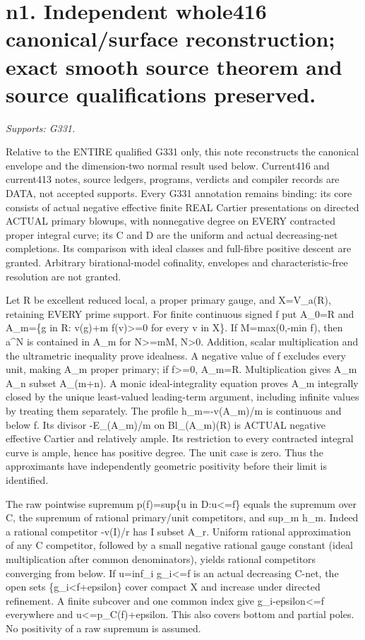 \section{n1. Independent whole416 canonical/surface reconstruction; exact smooth source theorem and source qualifications preserved.}
\textit{Supports: G331.}

Relative to the ENTIRE qualified G331 only, this note reconstructs the canonical envelope and the dimension-two normal result used below. Current416 and current413 notes, source ledgers, programs, verdicts and compiler records are DATA, not accepted supports. Every G331 annotation remains binding: its core consists of actual negative effective finite REAL Cartier presentations on directed ACTUAL primary blowups, with nonnegative degree on EVERY contracted proper integral curve; its C and D are the uniform and actual decreasing-net completions. Its comparison with ideal classes and full-fibre positive descent are granted. Arbitrary birational-model cofinality, envelopes and characteristic-free resolution are not granted.

Let R be excellent reduced local, a proper primary gauge, and X=V\_a(R), retaining EVERY prime support. For finite continuous signed f put A\_0=R and A\_m=\{g in R: v(g)+m f(v)\textgreater{}=0 for every v in X\}. If M=max(0,-min f), then a\textasciicircum{}N is contained in A\_m for N\textgreater{}=mM, N\textgreater{}0. Addition, scalar multiplication and the ultrametric inequality prove idealness. A negative value of f excludes every unit, making A\_m proper primary; if f\textgreater{}=0, A\_m=R. Multiplication gives A\_m A\_n subset A\_(m+n). A monic ideal-integrality equation proves A\_m integrally closed by the unique least-valued leading-term argument, including infinite values by treating them separately. The profile h\_m=-v(A\_m)/m is continuous and below f. Its divisor -E\_(A\_m)/m on Bl\_(A\_m)(R) is ACTUAL negative effective Cartier and relatively ample. Its restriction to every contracted integral curve is ample, hence has positive degree. The unit case is zero. Thus the approximants have independently geometric positivity before their limit is identified.

The raw pointwise supremum p(f)=sup\{u in D:u\textless{}=f\} equals the supremum over C, the supremum of rational primary/unit competitors, and sup\_m h\_m. Indeed a rational competitor -v(I)/r has I subset A\_r. Uniform rational approximation of any C competitor, followed by a small negative rational gauge constant (ideal multiplication after common denominators), yields rational competitors converging from below. If u=inf\_i g\_i\textless{}=f is an actual decreasing C-net, the open sets \{g\_i\textless{}f+epsilon\} cover compact X and increase under directed refinement. A finite subcover and one common index give g\_i-epsilon\textless{}=f everywhere and u\textless{}=p\_C(f)+epsilon. This also covers bottom and partial poles. No positivity of a raw supremum is assumed.

